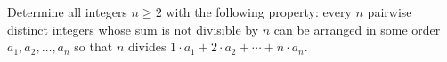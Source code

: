 Determine all integers $n \geq 2$ with the following property: every $n$ pairwise distinct integers whose sum is not divisible by $n$ can be arranged in some order $a_1, a_2, \ldots, a_n$ so that $n$ divides $1 \cdot a_1 + 2 \cdot a_2 + \cdots + n \cdot a_n$.
